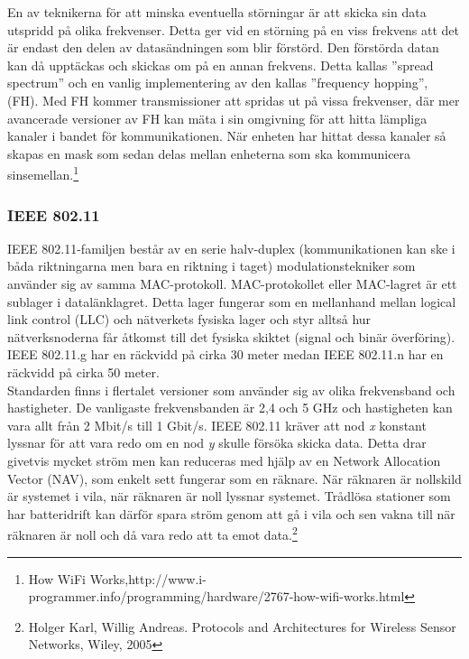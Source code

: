 \documentclass[a4paper,12pt,fleqn]{article}
\begin{document}
En av teknikerna för att minska eventuella störningar är att skicka sin data utspridd på olika frekvenser. Detta ger vid en störning på en viss frekvens att det är endast den delen av datasändningen som blir förstörd. Den förstörda datan kan då upptäckas och skickas om på en annan frekvens. Detta kallas ''spread spectrum'' och en vanlig implementering av den kallas ''frequency hopping'', (FH). Med FH kommer transmissioner att spridas ut på vissa frekvenser, där mer avancerade versioner av FH kan mäta i sin omgivning för att hitta lämpliga kanaler i bandet för kommunikationen. När enheten har hittat dessa kanaler så skapas en mask som sedan delas mellan enheterna som ska kommunicera sinsemellan.\footnote{
How WiFi Works,http://www.i-programmer.info/programming/hardware/2767-how-wifi-works.html}


\subsubsection{IEEE 802.11}
IEEE 802.11-familjen består av en serie halv-duplex (kommunikationen kan ske i båda riktningarna men bara en riktning i taget) modulationstekniker som använder sig av samma MAC-protokoll. MAC-protokollet eller MAC-lagret är ett sublager i datalänklagret. Detta lager fungerar som en mellanhand mellan logical link control (LLC) och nätverkets fysiska lager och styr alltså hur nätverksnoderna får åtkomst till det fysiska skiktet (signal och binär överföring). IEEE 802.11.g har en räckvidd på cirka 30 meter medan IEEE 802.11.n har en räckvidd på cirka 50 meter. \\
Standarden finns i flertalet versioner som använder sig av olika frekvensband och hastigheter. De vanligaste frekvensbanden är 2,4 och 5 GHz och hastigheten kan vara allt från 2 Mbit/s till 1 Gbit/s. IEEE 802.11 kräver att nod \emph{x} konstant lyssnar för att vara redo om en nod \emph{y} skulle försöka skicka data. Detta drar givetvis mycket ström men kan reduceras med hjälp av en Network Allocation Vector (NAV), som enkelt sett fungerar som en räknare. När räknaren är nollskild är systemet i vila, när räknaren är noll lyssnar systemet. Trådlösa stationer som har batteridrift kan därför spara ström genom att gå i vila och sen vakna till när räknaren är noll och då vara redo att ta emot data.\footnote{Holger Karl, Willig Andreas. Protocols and Architectures for Wireless Sensor Networks, Wiley, 2005}
\end{document}
